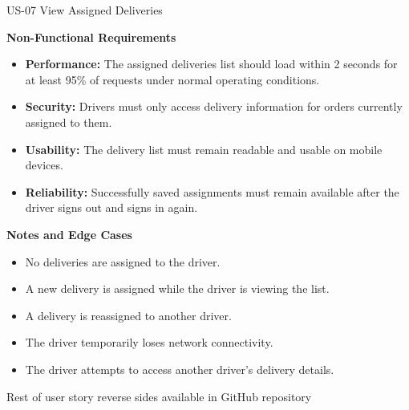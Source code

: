 \begin{frame}{US-07 View Assigned Deliveries}

\textbf{Non-Functional Requirements}
\begin{itemize}
  \item \textbf{Performance:} The assigned deliveries list should load within 2 seconds for at least 95\% of requests under normal operating conditions.
  \item \textbf{Security:} Drivers must only access delivery information for orders currently assigned to them.
  \item \textbf{Usability:} The delivery list must remain readable and usable on mobile devices.
  \item \textbf{Reliability:} Successfully saved assignments must remain available after the driver signs out and signs in again.
\end{itemize}

\textbf{Notes and Edge Cases}
\begin{itemize}
  \item No deliveries are assigned to the driver.
  \item A new delivery is assigned while the driver is viewing the list.
  \item A delivery is reassigned to another driver.
  \item The driver temporarily loses network connectivity.
  \item The driver attempts to access another driver's delivery details.
\end{itemize}
Rest of user story reverse sides available in GitHub repository

\end{frame}
